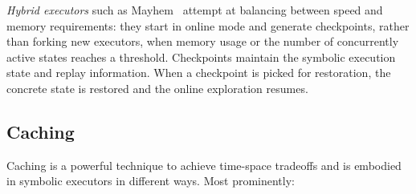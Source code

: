 {\em Hybrid executors} such as {\sc Mayhem}~\cite{MAYHEM-SP12} attempt at  balancing between speed and memory requirements: they start in online mode and generate checkpoints, rather than forking new executors, when memory usage or the number of concurrently active states reaches a threshold. Checkpoints maintain the symbolic execution state and replay information. When a checkpoint is picked for restoration, the concrete state is restored and the online exploration resumes.

\subsection{Caching} 
\label{caching}

Caching is a powerful technique to achieve time-space tradeoffs and is embodied in symbolic executors in different ways. Most prominently:

